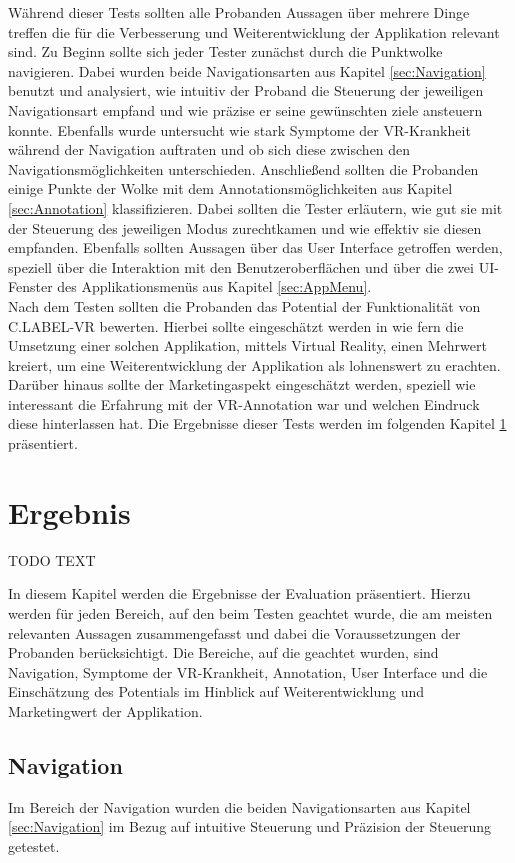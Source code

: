 Während dieser Tests sollten alle Probanden Aussagen über mehrere Dinge treffen die für die Verbesserung und Weiterentwicklung der Applikation relevant sind. Zu Beginn sollte sich jeder Tester zunächst durch die Punktwolke navigieren. Dabei wurden beide Navigationsarten aus Kapitel \ref{sec:Navigation} benutzt und analysiert, wie intuitiv der Proband die Steuerung der jeweiligen Navigationsart empfand und wie präzise er seine gewünschten ziele ansteuern konnte. Ebenfalls wurde untersucht wie stark Symptome der VR-Krankheit während der Navigation auftraten und ob sich diese zwischen den Navigationsmöglichkeiten unterschieden. Anschließend sollten die Probanden einige Punkte der Wolke mit dem Annotationsmöglichkeiten aus Kapitel \ref{sec:Annotation} klassifizieren. Dabei sollten die Tester erläutern, wie gut sie mit der Steuerung des jeweiligen Modus zurechtkamen und wie effektiv sie diesen empfanden. Ebenfalls sollten Aussagen über das User Interface getroffen werden, speziell über die Interaktion mit den Benutzeroberflächen und über die zwei UI-Fenster des Applikationsmenüs aus Kapitel \ref{sec:AppMenu}.\\

Nach dem Testen sollten die Probanden das Potential der Funktionalität von C.LABEL-VR bewerten. Hierbei sollte eingeschätzt werden in wie fern die Umsetzung einer solchen Applikation, mittels Virtual Reality, einen Mehrwert kreiert, um eine Weiterentwicklung der Applikation als lohnenswert zu erachten. Darüber hinaus sollte der Marketingaspekt eingeschätzt werden, speziell wie interessant die Erfahrung mit der VR-Annotation war und welchen Eindruck diese hinterlassen hat. Die Ergebnisse dieser Tests werden im folgenden Kapitel \ref{sec:EvaluationErgebnis} präsentiert.


\section{Ergebnis}
\label{sec:EvaluationErgebnis}
TODO TEXT

In diesem Kapitel werden die Ergebnisse der Evaluation präsentiert. Hierzu werden für jeden Bereich, auf den beim Testen geachtet wurde, die am meisten relevanten Aussagen zusammengefasst und dabei die Voraussetzungen der Probanden berücksichtigt. Die Bereiche, auf die geachtet wurden, sind Navigation, Symptome der VR-Krankheit, Annotation, User Interface und die Einschätzung des Potentials im Hinblick auf Weiterentwicklung und Marketingwert der Applikation. 

\subsection{Navigation}
Im Bereich der Navigation wurden die beiden Navigationsarten aus Kapitel \ref{sec:Navigation} im Bezug auf intuitive Steuerung und Präzision der Steuerung getestet.

